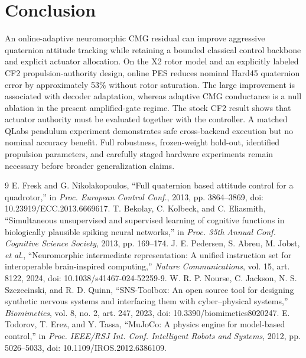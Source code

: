 \documentclass[10pt,twocolumn]{article}
\begin{document}
\section{Conclusion}

An online-adaptive neuromorphic CMG residual can improve aggressive
quaternion attitude tracking while retaining a bounded classical control
backbone and explicit actuator allocation. On the X2 rotor model and an
explicitly labeled CF2 propulsion-authority design, online PES reduces nominal
Hard45 quaternion error by approximately 53\% without rotor saturation. The
large improvement is associated with decoder adaptation, whereas adaptive CMG
conductance is a null ablation in the present amplified-gate regime.
The stock CF2 result shows that actuator authority must be evaluated together
with the controller. A matched QLabs pendulum experiment demonstrates safe
cross-backend execution but no nominal accuracy benefit. Full robustness,
frozen-weight hold-out, identified propulsion parameters, and carefully staged
hardware experiments remain necessary before broader generalization claims.

\begin{thebibliography}{9}
E. Fresk and G. Nikolakopoulos, ``Full quaternion based attitude control for a
quadrotor,'' in \emph{Proc. European Control Conf.}, 2013, pp. 3864--3869,
doi: 10.23919/ECC.2013.6669617.
T. Bekolay, C. Kolbeck, and C. Eliasmith, ``Simultaneous unsupervised and
supervised learning of cognitive functions in biologically plausible spiking
neural networks,'' in \emph{Proc. 35th Annual Conf. Cognitive Science Society},
2013, pp. 169--174.
J. E. Pedersen, S. Abreu, M. Jobst, \emph{et al.}, ``Neuromorphic
intermediate representation: A unified instruction set for interoperable
brain-inspired computing,'' \emph{Nature Communications}, vol. 15, art. 8122,
2024, doi: 10.1038/s41467-024-52259-9.
W. R. P. Nourse, C. Jackson, N. S. Szczecinski, and R. D. Quinn,
``SNS-Toolbox: An open source tool for designing synthetic nervous systems and
interfacing them with cyber--physical systems,'' \emph{Biomimetics}, vol. 8,
no. 2, art. 247, 2023, doi: 10.3390/biomimetics8020247.
E. Todorov, T. Erez, and Y. Tassa, ``MuJoCo: A physics engine for model-based
control,'' in \emph{Proc. IEEE/RSJ Int. Conf. Intelligent Robots and Systems},
2012, pp. 5026--5033, doi: 10.1109/IROS.2012.6386109.
\end{thebibliography}
\end{document}
